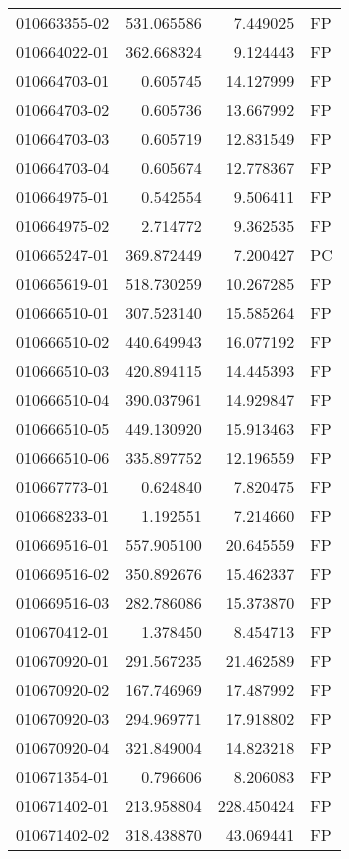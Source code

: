 \begin{tabular}{lrrl}
010663355-02 &  531.065586 &     7.449025 &   FP \\
010664022-01 &  362.668324 &     9.124443 &   FP \\
010664703-01 &    0.605745 &    14.127999 &   FP \\
010664703-02 &    0.605736 &    13.667992 &   FP \\
010664703-03 &    0.605719 &    12.831549 &   FP \\
010664703-04 &    0.605674 &    12.778367 &   FP \\
010664975-01 &    0.542554 &     9.506411 &   FP \\
010664975-02 &    2.714772 &     9.362535 &   FP \\
010665247-01 &  369.872449 &     7.200427 &   PC \\
010665619-01 &  518.730259 &    10.267285 &   FP \\
010666510-01 &  307.523140 &    15.585264 &   FP \\
010666510-02 &  440.649943 &    16.077192 &   FP \\
010666510-03 &  420.894115 &    14.445393 &   FP \\
010666510-04 &  390.037961 &    14.929847 &   FP \\
010666510-05 &  449.130920 &    15.913463 &   FP \\
010666510-06 &  335.897752 &    12.196559 &   FP \\
010667773-01 &    0.624840 &     7.820475 &   FP \\
010668233-01 &    1.192551 &     7.214660 &   FP \\
010669516-01 &  557.905100 &    20.645559 &   FP \\
010669516-02 &  350.892676 &    15.462337 &   FP \\
010669516-03 &  282.786086 &    15.373870 &   FP \\
010670412-01 &    1.378450 &     8.454713 &   FP \\
010670920-01 &  291.567235 &    21.462589 &   FP \\
010670920-02 &  167.746969 &    17.487992 &   FP \\
010670920-03 &  294.969771 &    17.918802 &   FP \\
010670920-04 &  321.849004 &    14.823218 &   FP \\
010671354-01 &    0.796606 &     8.206083 &   FP \\
010671402-01 &  213.958804 &   228.450424 &   FP \\
010671402-02 &  318.438870 &    43.069441 &   FP \\

\end{tabular}
